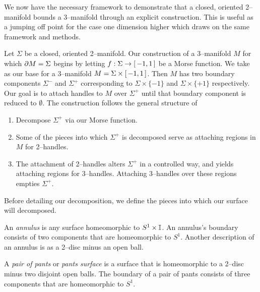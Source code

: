\label{sec:2bound3}

%		


We now have the necessary framework to demonstrate that a closed, oriented 2--manifold bounds a 3--manifold through an explicit construction.
This is useful as a jumping off point for the case one dimension higher which draws on the same framework and methods.

Let $\Sigma$ be a closed, oriented 2--manifold.
Our construction of a 3--manifold $M$ for which $\partial M=\Sigma$ begins by letting $f:\Sigma\to[\,-1,1\,]$ be a Morse function.
We take as our base for a 3--manifold $M=\Sigma\times[\,-1,1\,]$.
Then $M$ has two boundary components $\Sigma^-$ and $\Sigma^+$ corresponding to $\Sigma\times\{-1\}$ and $\Sigma\times\{+1\}$ respectively.
Our goal is to attach handles to $M$ over $\Sigma^+$ until that boundary component is reduced to $\emptyset$.
The construction follows the general structure of
\begin{enumerate}
	\item Decompose $\Sigma^+$ via our Morse function.
	\item Some of the pieces into which $\Sigma^+$ is decomposed serve as attaching regions in $M$ for 2--handles.
	\item The attachment of 2--handles alters $\Sigma^+$ in a controlled way, and yields attaching regions for 3--handles.  Attaching 3--handles over these regions empties $\Sigma^+$.
\end{enumerate}

Before detailing our decomposition, we define the pieces into which our surface will decomposed.

\begin{defn}
	\label{def:annulus}
	An \emph{annulus} is any surface homeomorphic to $S^1\times\mathbb{I}$.
	An annulus's boundary consists of two components that are homeomorphic to $S^1$.
	Another description of an annulus is as a 2--disc minus an open ball.
\end{defn}

\begin{defn}
	\label{def:pants}
	A \emph{pair of pants} or \emph{pants surface} is a surface that is homeomorphic to a 2--disc minus two disjoint open balls.
	The boundary of a pair of pants consists of three components that are homeomorphic to $S^1$.
\end{defn}

